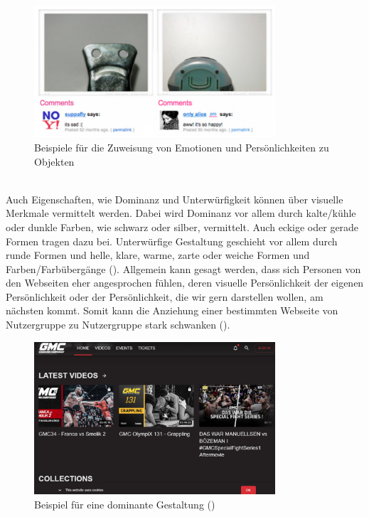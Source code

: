 \documentclass[./dokumentation.tex]{subfiles}
\begin{document}
\begin{figure}[H]
    \centering
    \includegraphics[width=0.8\textwidth]{bilder/sad-happy.png}
    \caption{Beispiele für die Zuweisung von Emotionen und Persönlichkeiten zu Objekten}
    \label{fig6:happy}
\end{figure}\\

Auch Eigenschaften, wie Dominanz und Unterwürfigkeit können über visuelle Merkmale vermittelt werden. Dabei wird Dominanz vor allem durch kalte/kühle oder dunkle Farben, wie schwarz oder silber, vermittelt. Auch eckige oder gerade Formen tragen dazu bei. Unterwürfige Gestaltung geschieht vor allem durch runde Formen und helle, klare, warme, zarte oder weiche Formen und Farben/Farbübergänge (\cite{DesignEmo2003}). Allgemein kann gesagt werden, dass sich Personen von den Webseiten eher angesprochen fühlen, deren visuelle Persönlichkeit der eigenen Persönlichkeit oder der Persönlichkeit, die wir gern darstellen wollen, am nächsten kommt. Somit kann die Anziehung einer bestimmten Webseite von Nutzergruppe zu Nutzergruppe stark schwanken (\cite{vanGorp2013}). \\

\begin{figure}[H]
    \centering
    \includegraphics[width=0.8\textwidth]{bilder/dom.png}
    \caption{Beispiel für eine dominante Gestaltung (\cite{dom_bsp})}
    \label{fig7:dom}
\end{figure}\\
\end{document}
